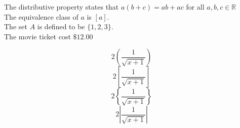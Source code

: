 \documentclass[18px]{article}
\begin{document}
The distributive property states that $a(b+c)=ab+ac$ for all $a,b,c \in \mathbb{R}$\\[6pt]
The equivalence class of $a$ is $[a]$.\\[6pt]
The set $A$ is defined to be $\{1,2,3\}$.\\[6pt]
The movie ticket cost $\$12.00$

$$2\left(\frac{1}{\sqrt{x + 1}}\right)$$
$$2\left[\frac{1}{\sqrt{x + 1}}\right]$$
$$2\left\{\frac{1}{\sqrt{x + 1}}\right\}$$
$$2\left|\frac{1}{\sqrt{x + 1}}\right|$$
\end{document}
